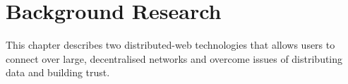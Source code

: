 \chapter{Background Research}

This chapter describes two distributed-web technologies that allows users to connect over large, decentralised networks and overcome issues of distributing data and building trust.


